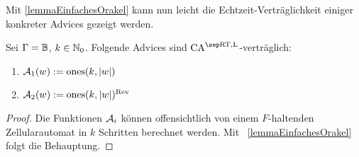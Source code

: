 Mit \cref{lemmaEinfachesOrakel} kann nun leicht die Echtzeit-Verträglichkeit einiger konkreter Advices gezeigt werden.
\begin{corollary}
    \label{bestimmteEinfacheAdvices}
    Sei $\Gamma = \mathbb{B}$, $k \in \mathbb{N}_0$.
    Folgende Advices sind $\CAM{\CART, \CALeft}$-verträglich:
    \begin{enumerate}
        \item $\mathcal{A}_1(w) := \mathrm{ones}(k, |w|)$ 
        \item $\mathcal{A}_2(w) := \mathrm{ones}(k, |w|)^{\mathrm{Rev}}$
    \end{enumerate}
\end{corollary}
\begin{proof}
    Die Funktionen $\mathcal{A}_i$ können offensichtlich
    von einem $F$-haltenden Zellularautomat in $k$ Schritten berechnet werden.
    Mit ~\cref{lemmaEinfachesOrakel} folgt die Behauptung.
\end{proof}

\begin{comment}
        $Q' := (Q_C \times \finset{ 0, \dots, c })$. Identifiziere $\Sigma' := \Sigma_C$ mit $(\finset{\chr{0}} \times \Sigma_C) \times \finset{0} $. Setze $\#' := (\#_C, 0)$.
        
        $\delta'(\Spvek{\#_C; k_a}, \Spvek{\Spvek{ \gamma_b; c_b}; k_b}, c) := \Spvek{ \Spvek{\chr{1}; c_b}; k_b + 1}$
        
        $\delta'(\Spvek{\Spvek{\gamma_a; c_a}; k_a}, \Spvek{\Spvek{\gamma_b; c_b}; k_b}, c)
            := \Spvek{ \Spvek{ \max \finset{\gamma_a, \gamma_b}; c_b}; k_b + 1}$
        
        $\delta'(a, \Spvek{q_b; k_b}, c) := \Spvek{q_b; k_b + 1}$
\end{comment}



